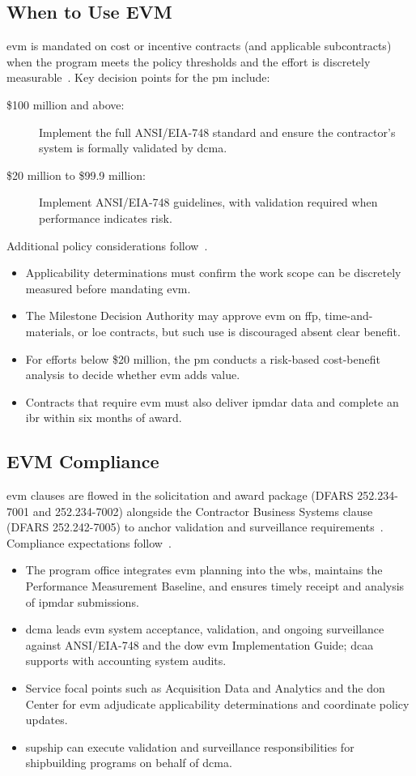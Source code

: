 \documentclass[../main.tex]{subfiles}
\begin{document}
\subsection{When to Use EVM}
\ac{evm} is mandated on cost or incentive contracts (and applicable subcontracts) when the program meets the policy thresholds and the effort is discretely measurable~\autocite{edo-3-6-1-evm-intro-2025,DFARS}. Key decision points for the \ac{pm} include:
\begin{description}
\item[\$100 million and above:] Implement the full ANSI/EIA-748 standard and ensure the contractor's system is formally validated by \ac{dcma}.
	\item[\$20 million to \$99.9 million:] Implement ANSI/EIA-748 guidelines, with validation required when performance indicates risk.
\end{description}
Additional policy considerations follow~\autocite{edo-3-6-1-evm-intro-2025,DoDI5000-85}.
\begin{itemize}
	\item Applicability determinations must confirm the work scope can be discretely measured before mandating \ac{evm}.
	\item The Milestone Decision Authority may approve \ac{evm} on \ac{ffp}, time-and-materials, or \ac{loe} contracts, but such use is discouraged absent clear benefit.
	\item For efforts below \$20 million, the \ac{pm} conducts a risk-based cost-benefit analysis to decide whether \ac{evm} adds value.
	\item Contracts that require \ac{evm} must also deliver \ac{ipmdar} data and complete an \ac{ibr} within six months of award.
\end{itemize}
\subsection{EVM Compliance}
\ac{evm} clauses are flowed in the solicitation and award package (DFARS 252.234-7001 and 252.234-7002) alongside the Contractor Business Systems clause (DFARS 252.242-7005) to anchor validation and surveillance requirements~\autocite{DFARS}. Compliance expectations follow~\autocite{edo-3-6-1-evm-intro-2025,DoDI5000-85}.
\begin{itemize}
	\item The program office integrates \ac{evm} planning into the \ac{wbs}, maintains the Performance Measurement Baseline, and ensures timely receipt and analysis of \ac{ipmdar} submissions.
	\item \ac{dcma} leads \ac{evm} system acceptance, validation, and ongoing surveillance against ANSI/EIA-748 and the \ac{dow} \ac{evm} Implementation Guide; \ac{dcaa} supports with accounting system audits.
	\item Service focal points such as Acquisition Data and Analytics and the \ac{don} Center for \ac{evm} adjudicate applicability determinations and coordinate policy updates.
	\item \ac{supship} can execute validation and surveillance responsibilities for shipbuilding programs on behalf of \ac{dcma}.
\end{itemize}
\end{document}
